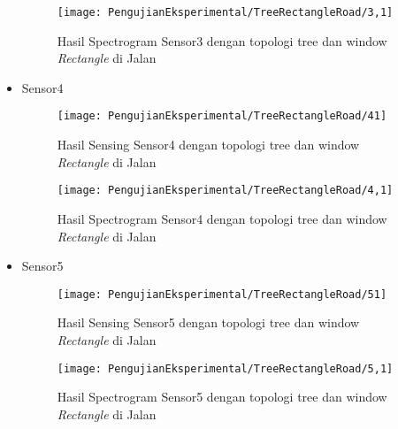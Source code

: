 \begin{itemize}
\begin{figure}[H]
	\centering
	\texttt{[image: PengujianEksperimental/TreeRectangleRoad/3,1]}
	\caption[Hasil Spectrogram Sensor3 dengan topologi tree dan window {\it Rectangle} di Jalan]{Hasil Spectrogram Sensor3 dengan topologi tree dan window {\it Rectangle} di Jalan} 
	\label{fig:hasilJalanTreeRect3,1}
\end{figure}

\item Sensor4
\begin{figure}[H]
	\centering
	\texttt{[image: PengujianEksperimental/TreeRectangleRoad/41]}
	\caption[Hasil Sensing Sensor4 dengan topologi tree dan window {\it Rectangle} di Jalan]{Hasil Sensing Sensor4 dengan topologi tree dan window {\it Rectangle} di Jalan} 
	\label{fig:hasilJalanTreeRect41}
\end{figure}

\begin{figure}[H]
	\centering
	\texttt{[image: PengujianEksperimental/TreeRectangleRoad/4,1]}
	\caption[Hasil Spectrogram Sensor4 dengan topologi tree dan window {\it Rectangle} di Jalan]{Hasil Spectrogram Sensor4 dengan topologi tree dan window {\it Rectangle} di Jalan} 
	\label{fig:hasilJalanTreeRect4,1}
\end{figure}

\item Sensor5
\begin{figure}[H]
	\centering
	\texttt{[image: PengujianEksperimental/TreeRectangleRoad/51]}
	\caption[Hasil Sensing Sensor5 dengan topologi tree dan window {\it Rectangle} di Jalan]{Hasil Sensing Sensor5 dengan topologi tree dan window {\it Rectangle} di Jalan} 
	\label{fig:hasilJalanTreeRect51}
\end{figure}

\begin{figure}[H]
	\centering
	\texttt{[image: PengujianEksperimental/TreeRectangleRoad/5,1]}
	\caption[Hasil Spectrogram Sensor5 dengan topologi tree dan window {\it Rectangle} di Jalan]{Hasil Spectrogram Sensor5 dengan topologi tree dan window {\it Rectangle} di Jalan} 
	\label{fig:hasilJalanTreeRect5,1}
\end{figure}
\end{itemize}

